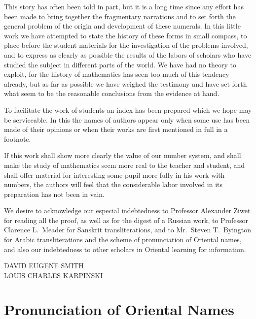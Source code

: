 \documentclass[11pt,a4paper]{article}
\begin{document}
This story has often been told in part, but it is a long time since any effort has been made to bring together the fragmentary narrations and to set forth the general problem of the origin and development of these numerals. In this little work we have attempted to state the history of these forms in small compass, to place before the student materials for the investigation of the problems involved, and to express as clearly as possible the results of the labors of scholars who have studied the subject in different parts of the world. We have had no theory to exploit, for the history of mathematics has seen too much of this tendency already, but as far as possible we have weighed the testimony and have set forth what seem to be the reasonable conclusions from the evidence at hand.

To facilitate the work of students an index has been prepared which we hope may be serviceable. In this the names of authors appear only when some use has been made of their opinions or when their works are first mentioned in full in a footnote.

If this work shall show more clearly the value of our number system, and shall make the study of mathematics seem more real to the teacher and student, and shall offer material for interesting some pupil more fully in his work with numbers, the authors will feel that the considerable labor involved in its preparation has not been in vain.

We desire to acknowledge our especial indebtedness to Professor Alexander Ziwet for reading all the proof, as well as for the digest of a Russian work, to Professor Clarence L.~Meader for Sanskrit transliterations, and to Mr.~Steven T.~Byington for Arabic transliterations and the scheme of pronunciation of Oriental names, and also our indebtedness to other scholars in Oriental learning for information.

\begin{flushright}
DAVID EUGENE SMITH\\
LOUIS CHARLES KARPINSKI
\end{flushright}

\newpage

\tableofcontents
\newpage

\section*{Pronunciation of Oriental Names}
\end{document}

